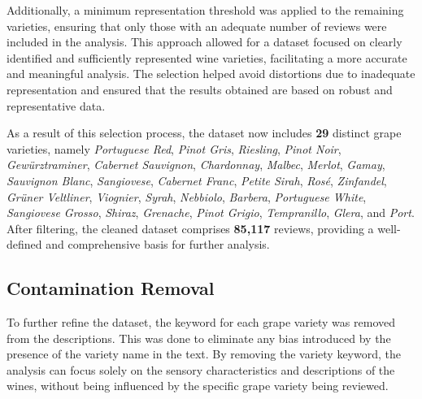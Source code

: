 Additionally, a minimum representation threshold was 
applied to the remaining varieties, ensuring that only 
those with an adequate number of reviews were included 
in the analysis. This approach allowed for a dataset 
focused on clearly identified and sufficiently 
represented wine varieties, facilitating a more 
accurate and meaningful analysis. The selection helped 
avoid distortions due to inadequate representation and 
ensured that the results obtained are based on robust 
and representative data.

As a result of this selection process, the dataset now 
includes \textbf{29} distinct grape varieties, namely 
\textit{Portuguese Red}, \textit{Pinot Gris}, \textit{Riesling}, 
\textit{Pinot Noir}, \textit{Gewürztraminer}, \textit{Cabernet Sauvignon}, 
\textit{Chardonnay}, \textit{Malbec}, \textit{Merlot}, \textit{Gamay}, 
\textit{Sauvignon Blanc}, \textit{Sangiovese}, \textit{Cabernet Franc}, 
\textit{Petite Sirah}, \textit{Rosé}, \textit{Zinfandel}, 
\textit{Grüner Veltliner}, \textit{Viognier}, \textit{Syrah}, 
\textit{Nebbiolo}, \textit{Barbera}, \textit{Portuguese White}, 
\textit{Sangiovese Grosso}, \textit{Shiraz}, \textit{Grenache}, 
\textit{Pinot Grigio}, \textit{Tempranillo}, \textit{Glera}, 
and \textit{Port}. 
After filtering, the cleaned dataset comprises \textbf{85,117} reviews, 
providing a well-defined and comprehensive basis for further analysis.

\subsection{Contamination Removal}
To further refine the dataset, the keyword for each
grape variety was removed from the descriptions. This
was done to eliminate any bias introduced by the
presence of the variety name in the text. By removing
the variety keyword, the analysis can focus solely on
the sensory characteristics and descriptions of the
wines, without being influenced by the specific grape
variety being reviewed.

